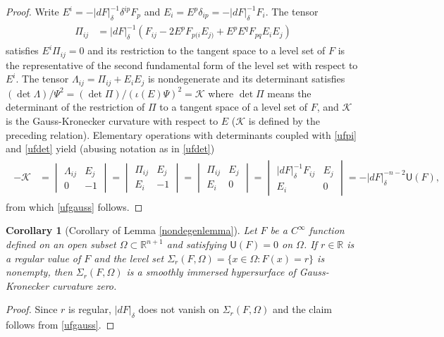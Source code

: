 \documentclass [leqno, 10pt]{amsart}
\newtheorem{corollary}[theorem]{Corollary}
\theoremstyle{definition}
\numberwithin{equation}{section}
\newcommand{\gau}{\mathscr{K}}
\newcommand{\Om}{\Omega}
\newcommand{\imt}{\iota}
\newcommand{\U}{\mathsf{U}}
\newcommand{\lc}{\Sigma}
\newcommand{\La}{\Lambda}
\newcommand{\cinf}{C^{\infty}}
\newcommand{\rea}{\mathbb R}
\begin{document}
\begin{proof}
Write $E^{i} = -|dF|_{\delta}^{-1}\delta^{ip}F_{p}$ and $E_{i} = E^{p}\delta_{ip} = - |dF|_{\delta}^{-1}F_{i}$. The tensor 
\begin{align}\label{ufpi}
\begin{split}
\Pi_{ij} &=  |dF|^{-1}_{\delta}\left(F_{ij} - 2E^{p}F_{p(i}E_{j)} + E^{p}E^{q}F_{pq}E_{i}E_{j}\right)
\end{split}
\end{align}
satisfies $E^{i}\Pi_{ij} = 0$ and its restriction to the tangent space to a level set of $F$ is the representative of the second fundamental form of the level set with respect to $E^{i}$. The tensor $\La_{ij} = \Pi_{ij} + E_{i}E_{j}$ is nondegenerate and its determinant satisfies $(\det \La)/\Psi^{2} = (\det \Pi)/(\imt(E)\Psi)^{2} = \gau$ where $\det \Pi$ means the determinant of the restriction of $\Pi$ to a tangent space of a level set of $F$, and $\gau$ is the Gauss-Kronecker curvature with respect to $E$ ($\gau$ is defined by the preceding relation). Elementary operations with determinants coupled with \eqref{ufpi} and \eqref{ufdet} yield (abusing notation as in \eqref{ufdet})
\begin{align}\label{ufg1}
\begin{split}
-\gau & = \begin{vmatrix} \La_{ij} & E_{j}\\ 0 & -1 \end{vmatrix} =  \begin{vmatrix} \Pi_{ij} & E_{j}\\ E_{i} & -1 \end{vmatrix}  =  \begin{vmatrix} \Pi_{ij} & E_{j}\\ E_{i} & 0 \end{vmatrix} = \begin{vmatrix} |dF|_{\delta}^{-1}F_{ij} & E_{j}\\ E_{i} & 0 \end{vmatrix} = -|dF|_{\delta}^{-n-2}\U(F),
\end{split}
\end{align}
from which \eqref{ufgauss} follows. 
\end{proof}

\begin{corollary}[Corollary of Lemma \ref{nondegenlemma}]\label{gkcorollary}
Let $F$ be a $\cinf$ function defined on an open subset $\Om \subset \rea^{n+1}$ and satisfying $\U(F) = 0$ on $\Om$. If $r \in \rea$ is a regular value of $F$ and the level set $\lc_{r}(F, \Om) = \{x \in \Om: F(x) = r\}$ is nonempty, then $\lc_{r}(F, \Om)$ is a smoothly immersed hypersurface of Gauss-Kronecker curvature zero.
\end{corollary}
\begin{proof}
Since $r$ is regular, $|dF|_{\delta}$ does not vanish on $\lc_{r}(F, \Om)$ and the claim follows from \eqref{ufgauss}.
\end{proof}
\end{document}
